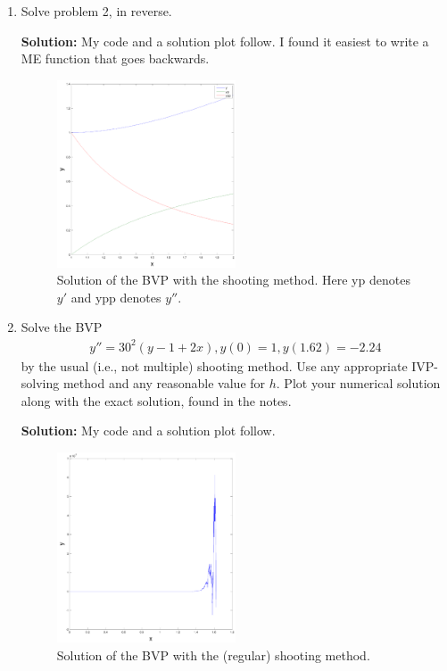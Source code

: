 \documentclass[11pt]{article}
\begin{document}
\begin{enumerate}
\item Solve problem 2, in reverse.

\bigskip
\textbf{Solution:} My code and a solution plot follow.
I found it easiest to write a ME function that goes backwards.



\begin{figure}[h!]
  \centering
    \includegraphics[width=0.5\textwidth]{andy_hw07_prb03_01.pdf}
  \caption{Solution of the BVP with the shooting method. Here yp denotes $y'$ and ypp denotes $y''$.}
\end{figure}

\item Solve the BVP
\begin{align*} y'' = 30^2 (y - 1 + 2x), y(0) = 1, y(1.62) = -2.24\end{align*}
by the usual (i.e., not multiple) shooting method.
Use any appropriate IVP-solving method and any reasonable value for $h$.
Plot your numerical solution along with the exact solution, found in the notes.

\bigskip
\textbf{Solution:} My code and a solution plot follow.



\begin{figure}[h!]
  \centering
    \includegraphics[width=0.5\textwidth]{andy_hw07_prb04_01.pdf}
  \caption{Solution of the BVP with the (regular) shooting method.}
\end{figure}


\end{enumerate}
\end{document}
